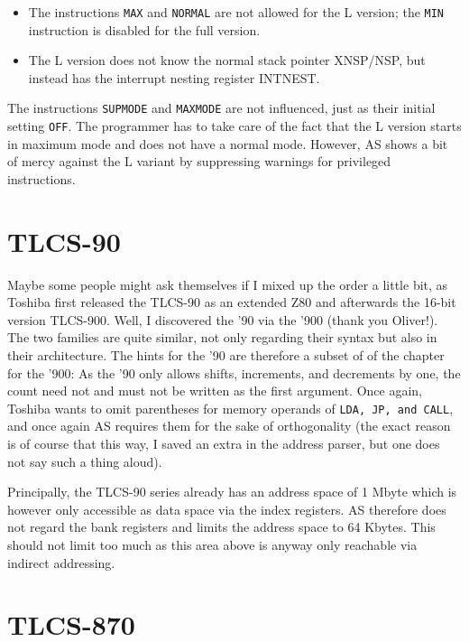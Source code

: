 \documentclass[12pt,twoside]{report}
\newcommand{\tty}[1]{{\tt #1}}
\begin{document}
\begin{itemize}
\item{The instructions \tty{MAX} and \tty{NORMAL} are not allowed for the L version;
      the \tty{MIN} instruction is disabled for the full version.}
\item{The L version does not know the normal stack pointer XNSP/NSP, but
      instead has the interrupt nesting register INTNEST.}
\end{itemize}
The instructions \tty{SUPMODE} and \tty{MAXMODE} are not influenced, just as
their initial setting \tty{OFF}.  The programmer has to take care of the
fact that the L version starts in maximum mode and does not have a
normal mode.  However, AS shows a bit of mercy against the L variant
by suppressing warnings for privileged instructions.


\section{TLCS-90}

Maybe some people might ask themselves if I mixed up the order a
little bit, as Toshiba first released the TLCS-90 as an extended Z80
and afterwards the 16-bit version TLCS-900.  Well, I discovered the
'90 via the '900 (thank you Oliver!).  The two families are quite
similar, not only regarding their syntax but also in their
architecture.  The hints for the '90 are therefore a subset of of the
chapter for the '900: As the '90 only allows shifts, increments, and
decrements by one, the count need not and must not be written as the
first argument.  Once again, Toshiba wants to omit parentheses for
memory operands of \tty{LDA, JP, and CALL}, and once again AS requires them
for the sake of orthogonality (the exact reason is of course that
this way, I saved an extra in the address parser, but one does not
say such a thing aloud).

Principally, the TLCS-90 series already has an address space of 1
Mbyte which is however only accessible as data space via the index
registers.  AS therefore does not regard the bank registers and
limits the address space to 64 Kbytes.  This should not limit too
much as this area above is anyway only reachable via indirect
addressing.


\section{TLCS-870}
\end{document}
